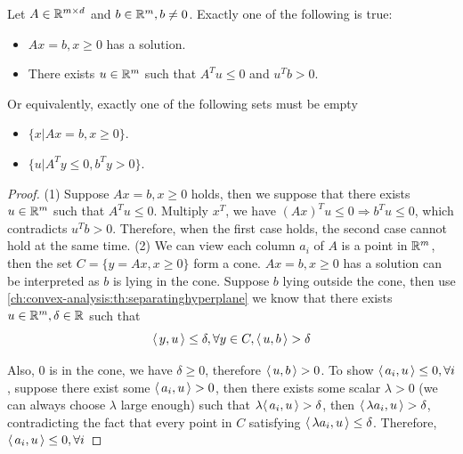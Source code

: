 \begin{refsection}
\begin{theorem}\label{ch:convex-analysis:th:Farkaslemma}
Let $A\in \mathbb{R}^{m\times d}$ and $b\in \mathbb{R}^m, b\neq 0$. Exactly one of the following is true:
\begin{itemize}
	\item $Ax = b,x\geq 0$ has a solution.
	\item There exists $u\in \mathbb{R}^m$ such that $A^Tu \leq 0$ and $u^Tb > 0$.
\end{itemize}

Or equivalently, exactly one of the following sets must be empty
\begin{itemize}
	\item $\{x|Ax = b, x\geq 0 \}$.
	\item $\{u|A^Ty\leq 0, b^Ty > 0\}$.
\end{itemize}

\end{theorem}
\begin{proof}
(1) Suppose $Ax=b,x\geq 0$ holds, then we suppose that there exists $u\in \mathbb{R}^m$ such that $A^Tu \leq 0$. Multiply $x^T$, we have $(Ax)^Tu \leq 0 \Rightarrow b^Tu \leq 0$, which contradicts $u^Tb > 0$. Therefore, when the first case holds, the second case cannot hold at the same time.
(2) We can view each column $a_i$ of $A$ is a point in $\mathbb{R}^m$, then the set $C = \{y=Ax,x\geq 0\}$ form a cone. $Ax=b,x\geq 0$ has a solution can be interpreted as $b$ is lying in the cone. Suppose $b$ lying outside the cone, then use \autoref{ch:convex-analysis:th:separatinghyperplane} we know that there exists $u\in \mathbb{R}^m,\delta \in \mathbb{R}$ such that
$${\left< \, y,u \, \right>}\leq \delta, \forall y\in C, {\left< \, u,b \, \right>} > \delta$$

Also, $0$ is in the cone, we have $\delta \geq 0$, therefore ${\left< \, u,b \, \right>} > 0$. To show ${\left< \, a_i,u \, \right>}\leq 0,\forall i$, suppose there exist some  ${\left< \, a_i,u \, \right>} > 0$, then there exists some scalar $\lambda > 0$ (we can always choose $\lambda$ large enough) such that $\lambda {\left< \, a_i,u \, \right>} > \delta$, then ${\left< \, \lambda a_i,u \, \right>} > \delta$, contradicting the fact that every point in $C$ satisfying ${\left< \, \lambda a_i,u \, \right>} \leq \delta$. Therefore, ${\left< \, a_i,u \, \right>}\leq 0,\forall i$
\end{proof}


\end{refsection}
